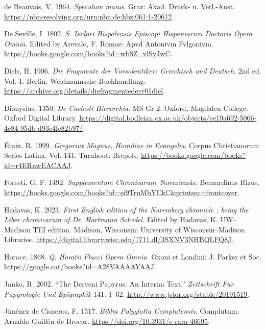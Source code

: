 \documentclass[
]{article}
\newlength{\cslhangindent}
\newlength{\cslentryspacingunit} %
\newenvironment{CSLReferences}[2] %
 {%
  \setlength{\parindent}{0pt}
  \ifodd #1
  \let\oldpar\par
  \def\par{\hangindent=\cslhangindent\oldpar}
  \fi
  \setlength{\parskip}{#2\cslentryspacingunit}
 }%
 {}
\begin{document}
\begin{CSLReferences}{1}{0}
\leavevmode{}%
de Beauvais, V. 1964. \emph{{Speculum maius}}. Graz: {Akad. Druck- u.
Verl.-Anst.} \url{https://nbn-resolving.org/urn:nbn:de:hbz:061:1-20612}.

\leavevmode{}%
De Seville, I. 1802. \emph{S. Isidori Hispalensis Episcopi Hispaniarum
Doctoris Opera Omnia}. Edited by Arevalo, F. Romae: Apvd Antonivm
Fvlgonivm. \url{https://books.google.com/books?id=wb8Z_vlSyJwC}.

\leavevmode{}%
Diels, H. 1906. \emph{{Die Fragmente der Vorsokratiker}: {Griechisch und
Deutsch}}. 2nd ed. Vol. 1. Berlin: Weidmannsche Buchhandlung.
\url{https://archive.org/details/diefragmentederv01diel}.

\leavevmode{}%
Dionysius. 1350. \emph{De Caelesti Hierarchia}. MS Gr 2. Oxford,
Magdalen College: Oxford Digital Library.
\url{https://digital.bodleian.ox.ac.uk/objects/ee19a692-5066-4c84-95db-d93c4fc82b97/}.

\leavevmode{}%
Étaix, R. 1999. \emph{Gregorius Magnus, Homiliae in Evangelia}. Corpus
Christianorum Series Latina. Vol. 141. Turnhout: Brepols.
\url{https://books.google.com/books?id=r4ERnwEACAAJ}.

\leavevmode{}%
Foresti, G. F. 1492. \emph{Supplementum Chronicarum}. Novariensis:
Bernardinus Rizus.
\url{https://books.google.com/books?id=ei9TruMbYCkC\&printsec=frontcover}.

\leavevmode{}%
Hadavas, K. 2023. \emph{{First English edition of the Nuremberg
chronicle : being the Liber chronicarum of Dr. Hartmann Schedel}}.
Edited by Hadavas, K. UW--Madison TEI edition. Madison, Wisconsin:
University of Wisconsin--Madison Libraries.
\url{https://digital.library.wisc.edu/1711.dl/3SXNV3NHBQLFQ8J}.

\leavevmode{}%
Horace. 1868. \emph{Q. Horatii Flacci Opera Omnia}. Oxoni et Londini: J.
Parker et Soc. \url{https://google.cat/books?id=A28VAAAAYAAJ}.

\leavevmode{}%
Janko, R. 2002. {``The Derveni Papyrus: An Interim Text.''}
\emph{Zeitschrift Für Papyrologie Und Epigraphik} 141: 1--62.
\url{http://www.jstor.org/stable/20191519}.

\leavevmode{}%
Jiménez de Cisneros, F. 1517. \emph{Biblia Polyglotta Complutensis}.
Complutum: Arnaldo Guillén de Brocar.
\url{https://doi.org/10.3931/e-rara-46695}.


\end{CSLReferences}
\end{document}
